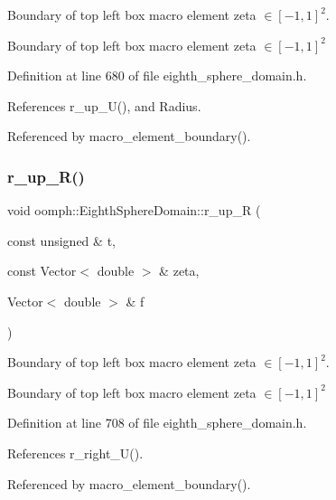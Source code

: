 Boundary of top left box macro element zeta $ \in [-1,1]^2 $. 

Boundary of top left box macro element zeta $ \in [-1,1]^2 $ 

Definition at line 680 of file eighth\+\_\+sphere\+\_\+domain.\+h.



References r\+\_\+up\+\_\+\+U(), and Radius.



Referenced by macro\+\_\+element\+\_\+boundary().

\mbox{\label{classoomph_1_1EighthSphereDomain_ad38d27ad06d83c94c768fbda98c939e7}} 
\subsubsection{\texorpdfstring{r\+\_\+up\+\_\+\+R()}{r\_up\_R()}}
{\footnotesize\ttfamily void oomph\+::\+Eighth\+Sphere\+Domain\+::r\+\_\+up\+\_\+R (\begin{DoxyParamCaption}\item[{const unsigned \&}]{t,  }\item[{const Vector$<$ double $>$ \&}]{zeta,  }\item[{Vector$<$ double $>$ \&}]{f }\end{DoxyParamCaption})\hspace{0.3cm}{\ttfamily [private]}}



Boundary of top left box macro element zeta $ \in [-1,1]^2 $. 

Boundary of top left box macro element zeta $ \in [-1,1]^2 $ 

Definition at line 708 of file eighth\+\_\+sphere\+\_\+domain.\+h.



References r\+\_\+right\+\_\+\+U().



Referenced by macro\+\_\+element\+\_\+boundary().

\mbox{\label{classoomph_1_1EighthSphereDomain_a303c406fe673675f497522dae69f849c}} 
